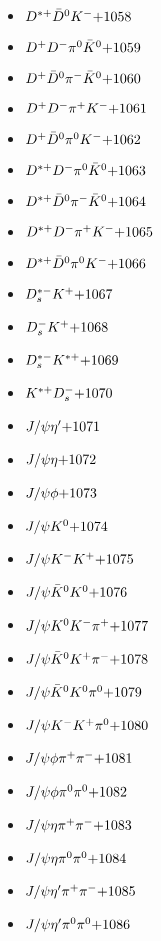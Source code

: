 \begin{multicols}{3}
\begin{itemize}
 \item $ D^{*+} \bar{D}^{0} K^{-} \hfill{+1058}$
 \item $ D^{+} D^{-} \pi^{0} \bar{K}^{0} \hfill{+1059}$
 \item $ D^{+} \bar{D}^{0} \pi^{-} \bar{K}^{0} \hfill{+1060}$
 \item $ D^{+} D^{-} \pi^{+} K^{-} \hfill{+1061}$
 \item $ D^{+} \bar{D}^{0} \pi^{0} K^{-} \hfill{+1062}$
 \item $ D^{*+} D^{-} \pi^{0} \bar{K}^{0} \hfill{+1063}$
 \item $ D^{*+} \bar{D}^{0} \pi^{-} \bar{K}^{0} \hfill{+1064}$
 \item $ D^{*+} D^{-} \pi^{+} K^{-} \hfill{+1065}$
 \item $ D^{*+} \bar{D}^{0} \pi^{0} K^{-} \hfill{+1066}$
 \item $ D_{s}^{*-} K^{+} \hfill{+1067}$
 \item $ D_{s}^{-} K^{+} \hfill{+1068}$
 \item $ D_{s}^{*-} K^{*+} \hfill{+1069}$
 \item $ K^{*+} D_{s}^{-} \hfill{+1070}$
 \item $ J/\psi {\eta^{\prime}} \hfill{+1071}$
 \item $ J/\psi \eta \hfill{+1072}$
 \item $ J/\psi \phi \hfill{+1073}$
 \item $ J/\psi K^{0} \hfill{+1074}$
 \item $ J/\psi K^{-} K^{+} \hfill{+1075}$
 \item $ J/\psi \bar{K}^{0} K^{0} \hfill{+1076}$
 \item $ J/\psi K^{0} K^{-} \pi^{+} \hfill{+1077}$
 \item $ J/\psi \bar{K}^{0} K^{+} \pi^{-} \hfill{+1078}$
 \item $ J/\psi \bar{K}^{0} K^{0} \pi^{0} \hfill{+1079}$
 \item $ J/\psi K^{-} K^{+} \pi^{0} \hfill{+1080}$
 \item $ J/\psi \phi \pi^{+} \pi^{-} \hfill{+1081}$
 \item $ J/\psi \phi \pi^{0} \pi^{0} \hfill{+1082}$
 \item $ J/\psi \eta \pi^{+} \pi^{-} \hfill{+1083}$
 \item $ J/\psi \eta \pi^{0} \pi^{0} \hfill{+1084}$
 \item $ J/\psi {\eta^{\prime}} \pi^{+} \pi^{-} \hfill{+1085}$
 \item $ J/\psi {\eta^{\prime}} \pi^{0} \pi^{0} \hfill{+1086}$

\end{itemize}
\end{multicols}
